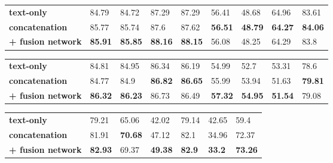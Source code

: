 \documentclass[11pt]{article}
\begin{document}
\begin{table*}
\centering
\begin{subtable}{\textwidth}
\centering
\small
\setlength{\tabcolsep}{3pt}
\renewcommand{\arraystretch}{1.2}
\begin{tabular}{lllllllll}
\hline
 &  &  &  &  &  &  &  &  \\ \hline
\textbf{text-only} & 84.79 & 84.72 & 87.29 & 87.29 & 56.41 & 48.68 & 64.96 & 83.61 \\ \hline
\textbf{concatenation} & 85.77 & 85.74 & 87.6 & 87.62 & \textbf{56.51} & \textbf{48.79} & \textbf{64.27} & \textbf{84.06} \\ 
\textbf{+ fusion network} & \textbf{85.91} & \textbf{85.85} & \textbf{88.16} & \textbf{88.15} & 56.08 & 48.25 & 64.29 & 83.8 \\ \hline
\end{tabular}
\caption{CMU-MOSI}
\label{tab:CMU-MOSI2}
\end{subtable}
\vspace{0.3cm}
\begin{subtable}{\textwidth}
\centering
\small
\setlength{\tabcolsep}{3pt}
\renewcommand{\arraystretch}{1.2}
\begin{tabular}{lllllllll}
\hline
 &  &  &  &  &  &  &  &  \\ \hline
\textbf{text-only} & 84.81 & 84.95 & 86.34 & 86.19 & 54.99 & 52.7 & 53.31 & 78.6 \\ \hline
\textbf{concatenation} & 84.77 & 84.9 & \textbf{86.82} & \textbf{86.65} & 55.99 & 53.94 & 51.63 & \textbf{79.81} \\ 
\textbf{+ fusion network} & \textbf{86.32} & \textbf{86.23} & 86.73 & 86.49 & \textbf{57.32} & \textbf{54.95} & \textbf{51.54} & 79.08 \\ \hline
\end{tabular}
\caption{CMU-MOSEI}
\label{tab:CMU-MOSEI2}
\end{subtable}
\vspace{0.3cm}
\begin{subtable}{\textwidth}
\centering
\small
\setlength{\tabcolsep}{3pt}
\renewcommand{\arraystretch}{1.2}
\begin{tabular}{lllllll}
\hline
 &  &  &  &  &  &  \\ \hline
\textbf{text-only} & 79.21 & 65.06 & 42.02 & 79.14 & 42.65 & 59.4 \\ \hline
\textbf{concatenation} & 81.91 & \textbf{70.68} & 47.12 & 82.1 & 34.96 & 72.37 \\ 
\textbf{+ fusion network} & \textbf{82.93} & 69.37 & \textbf{49.38} & \textbf{82.9} & \textbf{33.2} & \textbf{73.26} \\ \hline
\end{tabular}
\caption{CH-SIMS}
\label{tab:CH-SIMS2}
\end{subtable}
\caption{\textbf{Concatenation vs.~Transformer Fusion}: Integration of audio signals enhances performance across almost all metrics, with more pronounced impact on CH-SIMS. Implementing the Fusion Network augments performance slightly in most metrics. All experimental results presented are averages derived from three separate runs.}
\label{tab:Performance3}
\end{table*}
\end{document}
